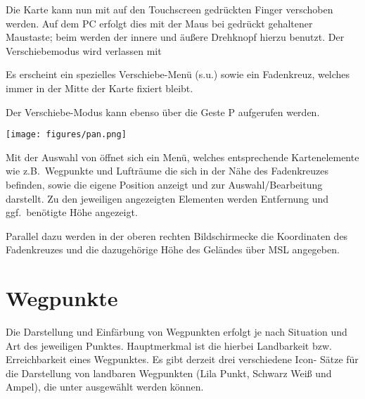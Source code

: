 Die Karte kann nun mit auf den Touchscreen gedrückten Finger verschoben werden. Auf dem \textsf{PC}  erfolgt dies mit der Maus bei gedrückt gehaltener Maustaste; beim \al werden der innere und äußere Drehknopf hierzu benutzt. Der Verschiebemodus wird verlassen mit 

Es erscheint ein spezielles Verschiebe-Menü (s.u.) sowie ein Fadenkreuz, welches immer in der Mitte der Karte fixiert bleibt.

Der Verschiebe-Modus kann ebenso über die Geste P  aufgerufen werden.

\begin{center}
\texttt{[image: figures/pan.png]}
\end{center}
Mit der Auswahl von  öffnet sich ein Menü, welches entsprechende Kartenelemente wie z.B.\ Wegpunkte und Lufträume die sich in der Nähe des Fadenkreuzes befinden, sowie die eigene Position anzeigt und zur Auswahl/Bearbeitung darstellt. Zu den jeweiligen angezeigten Elementen werden Entfernung und ggf.\ benötigte Höhe angezeigt.

Parallel dazu werden in der oberen rechten Bildschirmecke die Koordinaten des Fadenkreuzes und die dazugehörige Höhe des Geländes über MSL angegeben.  

\section{Wegpunkte} \label{sec:waypoint-schemes}
Die Darstellung und Einfärbung von Wegpunkten erfolgt je nach Situation und Art des jeweiligen Punktes. Hauptmerkmal ist die hierbei Landbarkeit bzw. Erreichbarkeit eines Wegpunktes.  Es gibt derzeit drei verschiedene Icon- Sätze  für die Darstellung von landbaren Wegpunkten  (Lila Punkt, Schwarz Weiß und Ampel), die unter 
 ausgewählt werden können.

